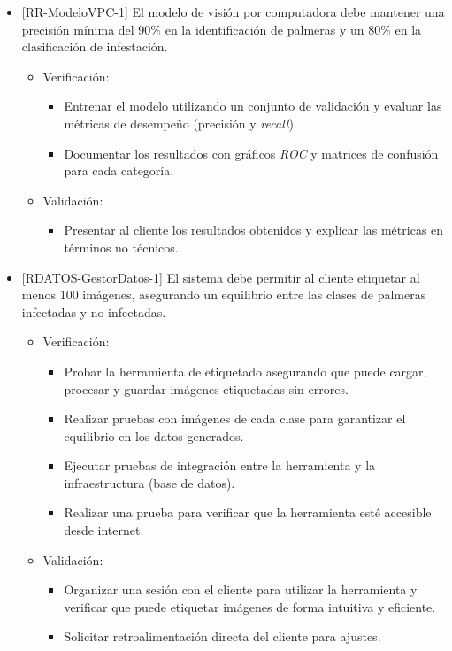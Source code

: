 \documentclass[
11pt, %
]{charter}
\begin{document}
\begin{itemize}[label={}]
  \item {[}RR-ModeloVPC-1{]} El modelo de visión por computadora debe mantener una precisión mínima del 90\% en la identificación de palmeras y un 80\% en la clasificación de infestación.
        \begin{itemize}
          \item Verificación:
                \begin{itemize}
                  \item Entrenar el modelo utilizando un conjunto de validación y evaluar las métricas de desempeño (precisión y \textit{recall}).
                  \item Documentar los resultados con gráficos \textit{ROC} y matrices de confusión para cada categoría.
                \end{itemize}
          \item Validación:
                \begin{itemize}
                  \item Presentar al cliente los resultados obtenidos y explicar las métricas en términos no técnicos.
                \end{itemize}
        \end{itemize}

  \item {[}RDATOS-GestorDatos-1{]} El sistema debe permitir al cliente etiquetar al menos 100 imágenes, asegurando un equilibrio entre las clases de palmeras infectadas y no infectadas.
        \begin{itemize}
          \item Verificación:
                \begin{itemize}
                  \item Probar la herramienta de etiquetado asegurando que puede cargar, procesar y guardar imágenes etiquetadas sin errores.
                  \item Realizar pruebas con imágenes de cada clase para garantizar el equilibrio en los datos generados.
                  \item Ejecutar pruebas de integración entre la herramienta y la infraestructura (base de datos).
                  \item Realizar una prueba para verificar que la herramienta esté accesible desde internet.
                \end{itemize}
          \item Validación:
                \begin{itemize}
                  \item Organizar una sesión con el cliente para utilizar la herramienta y verificar que puede etiquetar imágenes de forma intuitiva y eficiente.
                  \item Solicitar retroalimentación directa del cliente para ajustes.
                \end{itemize}
        \end{itemize}


\end{itemize}
\end{document}
